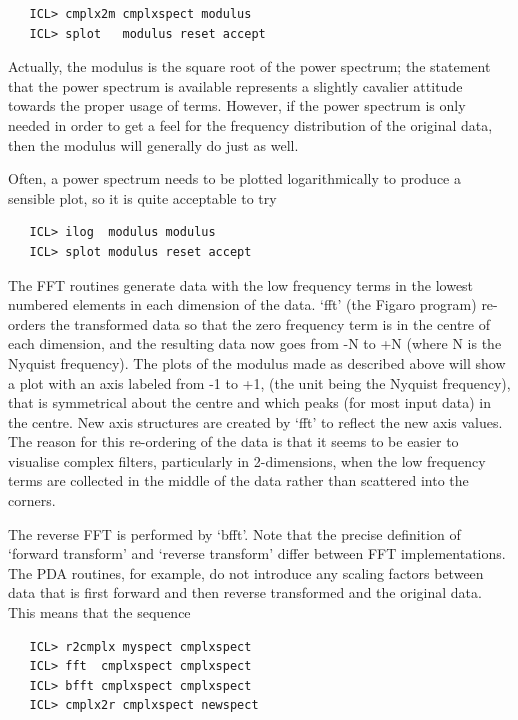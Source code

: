 \begin{verbatim}
   ICL> cmplx2m cmplxspect modulus
   ICL> splot   modulus reset accept
\end{verbatim}

   Actually, the modulus is the square root of the power spectrum; the
   statement that the power spectrum is available represents a slightly
   cavalier attitude towards the proper usage of terms.  However, if the
   power spectrum is only needed in order to get a feel for the
   frequency distribution of the original data, then the modulus will
   generally do just as well.

   Often, a power spectrum needs to be plotted logarithmically to
   produce a sensible plot, so it is quite acceptable to try

\begin{verbatim}
   ICL> ilog  modulus modulus
   ICL> splot modulus reset accept
\end{verbatim}

   The FFT routines generate data with the low frequency terms in
   the lowest numbered elements in each dimension of the data. `fft'
   (the Figaro program) re-orders the transformed data so that the zero
   frequency term is in the centre of each dimension, and the resulting
   data now goes from -N to +N (where N is the Nyquist frequency).  The
   plots of the modulus made as described above will show a plot with an
   axis labeled from -1 to +1, (the unit being the Nyquist frequency),
   that is symmetrical about the centre and which peaks (for most input
   data) in the centre.  New axis structures are created by `fft' to
   reflect the new axis values.  The reason for this re-ordering of the
   data is that it seems to be easier to visualise complex filters,
   particularly in 2-dimensions, when the low frequency terms are
   collected in the middle of the data rather than scattered into the
   corners.

   The reverse FFT is performed by `bfft'.  Note that the precise
   definition  of `forward transform' and `reverse transform' differ
   between FFT implementations.  The PDA routines, for example, do not
   introduce any scaling factors between data that is first forward and
   then reverse transformed and the original data.  This means that the
   sequence

\begin{verbatim}
   ICL> r2cmplx myspect cmplxspect
   ICL> fft  cmplxspect cmplxspect
   ICL> bfft cmplxspect cmplxspect
   ICL> cmplx2r cmplxspect newspect
\end{verbatim}

